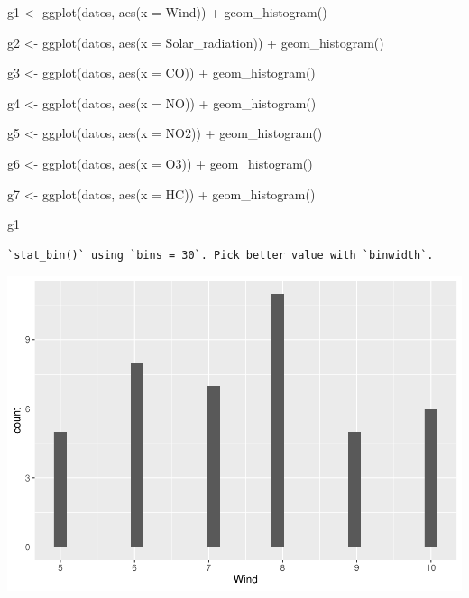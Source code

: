 \documentclass[
]{article}
\newenvironment{Shaded}{\begin{snugshade}}{\end{snugshade}}
\newcommand{\AttributeTok}[1]{\textcolor[rgb]{0.77,0.63,0.00}{#1}}
\newcommand{\FunctionTok}[1]{\textcolor[rgb]{0.00,0.00,0.00}{#1}}
\newcommand{\NormalTok}[1]{#1}
\newcommand{\OtherTok}[1]{\textcolor[rgb]{0.56,0.35,0.01}{#1}}
\newcommand{\SpecialCharTok}[1]{\textcolor[rgb]{0.00,0.00,0.00}{#1}}
\begin{document}
\begin{Shaded}
\begin{Highlighting}[]
\NormalTok{g1 }\OtherTok{\textless{}{-}} \FunctionTok{ggplot}\NormalTok{(datos, }\FunctionTok{aes}\NormalTok{(}\AttributeTok{x =}\NormalTok{ Wind)) }\SpecialCharTok{+}
  \FunctionTok{geom\_histogram}\NormalTok{()}

\NormalTok{g2 }\OtherTok{\textless{}{-}} \FunctionTok{ggplot}\NormalTok{(datos, }\FunctionTok{aes}\NormalTok{(}\AttributeTok{x =}\NormalTok{ Solar\_radiation)) }\SpecialCharTok{+}
  \FunctionTok{geom\_histogram}\NormalTok{()}

\NormalTok{g3 }\OtherTok{\textless{}{-}} \FunctionTok{ggplot}\NormalTok{(datos, }\FunctionTok{aes}\NormalTok{(}\AttributeTok{x =}\NormalTok{ CO)) }\SpecialCharTok{+}
  \FunctionTok{geom\_histogram}\NormalTok{()}

\NormalTok{g4 }\OtherTok{\textless{}{-}} \FunctionTok{ggplot}\NormalTok{(datos, }\FunctionTok{aes}\NormalTok{(}\AttributeTok{x =}\NormalTok{ NO)) }\SpecialCharTok{+}
  \FunctionTok{geom\_histogram}\NormalTok{()}

\NormalTok{g5 }\OtherTok{\textless{}{-}} \FunctionTok{ggplot}\NormalTok{(datos, }\FunctionTok{aes}\NormalTok{(}\AttributeTok{x =}\NormalTok{ NO2)) }\SpecialCharTok{+}
  \FunctionTok{geom\_histogram}\NormalTok{()}

\NormalTok{g6 }\OtherTok{\textless{}{-}} \FunctionTok{ggplot}\NormalTok{(datos, }\FunctionTok{aes}\NormalTok{(}\AttributeTok{x =}\NormalTok{ O3)) }\SpecialCharTok{+}
  \FunctionTok{geom\_histogram}\NormalTok{()}

\NormalTok{g7 }\OtherTok{\textless{}{-}} \FunctionTok{ggplot}\NormalTok{(datos, }\FunctionTok{aes}\NormalTok{(}\AttributeTok{x =}\NormalTok{ HC)) }\SpecialCharTok{+}
  \FunctionTok{geom\_histogram}\NormalTok{()}


\NormalTok{g1}
\end{Highlighting}
\end{Shaded}

\begin{verbatim}
`stat_bin()` using `bins = 30`. Pick better value with `binwidth`.
\end{verbatim}

\includegraphics{Tarea1_files/figure-latex/unnamed-chunk-9-2.pdf}
\end{document}
